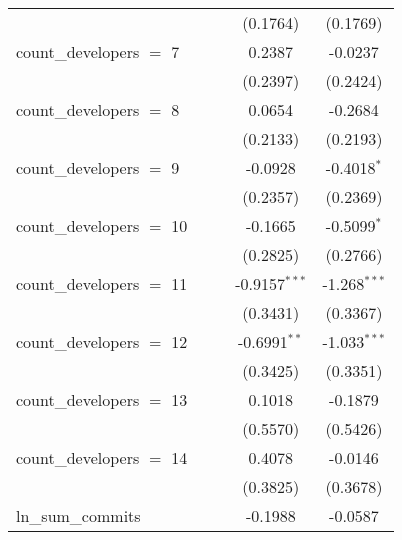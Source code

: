 \begin{tabular}{lcccc}
                                        &                &                & (0.1764)        & (0.1769)\\   
   count\_developers $=$ 7              &                &                & 0.2387          & -0.0237\\   
                                        &                &                & (0.2397)        & (0.2424)\\   
   count\_developers $=$ 8              &                &                & 0.0654          & -0.2684\\   
                                        &                &                & (0.2133)        & (0.2193)\\   
   count\_developers $=$ 9              &                &                & -0.0928         & -0.4018$^{*}$\\   
                                        &                &                & (0.2357)        & (0.2369)\\   
   count\_developers $=$ 10             &                &                & -0.1665         & -0.5099$^{*}$\\   
                                        &                &                & (0.2825)        & (0.2766)\\   
   count\_developers $=$ 11             &                &                & -0.9157$^{***}$ & -1.268$^{***}$\\   
                                        &                &                & (0.3431)        & (0.3367)\\   
   count\_developers $=$ 12             &                &                & -0.6991$^{**}$  & -1.033$^{***}$\\   
                                        &                &                & (0.3425)        & (0.3351)\\   
   count\_developers $=$ 13             &                &                & 0.1018          & -0.1879\\   
                                        &                &                & (0.5570)        & (0.5426)\\   
   count\_developers $=$ 14             &                &                & 0.4078          & -0.0146\\   
                                        &                &                & (0.3825)        & (0.3678)\\   
   ln\_sum\_commits                     &                &                & -0.1988         & -0.0587\\   

\end{tabular}
